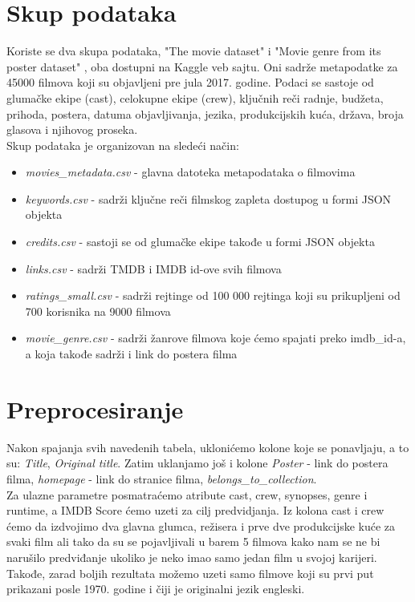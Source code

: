 \documentclass[a4paper]{article}
\begin{document}
\section{Skup podataka}
\label{sec:skupPodataka}
Koriste se dva skupa podataka, "The movie dataset" \cite{movieDataset} i "Movie genre from its poster dataset" \cite{movieGenres}, oba dostupni na Kaggle \cite{kaggle} veb sajtu. Oni sadrže metapodatke za 45000 filmova koji su objavljeni pre jula 2017. godine. Podaci se sastoje od glumačke ekipe (cast), celokupne ekipe (crew), ključnih reči radnje, budžeta, prihoda, postera, datuma objavljivanja, jezika, produkcijskih kuća, država, broja glasova i njihovog proseka.\\

Skup podataka je organizovan na sledeći način:
\begin{itemize}
	\item \textit{movies\_metadata.csv} - glavna datoteka metapodataka o filmovima
	\item \textit{keywords.csv} - sadrži ključne reči filmskog zapleta dostupog u formi JSON objekta
	\item \textit{credits.csv} - sastoji se od glumačke ekipe takođe u formi JSON objekta
	\item \textit{links.csv} - sadrži TMDB i IMDB id-ove svih filmova
	\item \textit{ratings\_small.csv} - sadrži rejtinge od 100 000 rejtinga koji su prikupljeni od 700 korisnika na 9000 filmova
	\item \textit{movie\_genre.csv} - sadrži žanrove filmova koje ćemo spajati preko imdb\_id-a, a koja takođe sadrži i link do postera filma
\end{itemize}


\section{Preprocesiranje}
\label{sec:preprocesiranje}

Nakon spajanja svih navedenih tabela, uklonićemo kolone koje se ponavljaju, a to su: \textit{Title}, \textit{Original title}. Zatim uklanjamo još i kolone \textit{Poster} - link do postera filma, \textit{homepage} - link do stranice filma, \textit{belongs\_to\_collection}.\\

Za ulazne parametre posmatraćemo atribute cast, crew, synopses, genre i runtime, a IMDB Score ćemo uzeti za cilj predvidjanja. Iz kolona cast i crew ćemo da izdvojimo dva glavna glumca, režisera i prve dve produkcijske kuće za svaki film ali tako da su se pojavljivali u barem 5 filmova kako nam se ne bi narušilo predviđanje ukoliko je neko imao samo jedan film u svojoj karijeri. Takođe, zarad boljih rezultata možemo uzeti samo filmove koji su prvi put prikazani posle 1970. godine i čiji je originalni jezik engleski.\\
\end{document}
